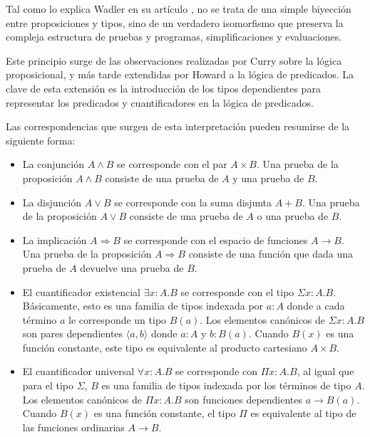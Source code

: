 Tal como lo explica Wadler en su artículo \cite{pas}, no se trata de una simple biyección entre proposiciones y tipos, sino de un verdadero isomorfismo que preserva la compleja estructura de pruebas y programas, simplificaciones y evaluaciones.

Este principio surge de las observaciones realizadas por Curry \cite{Curry} sobre la lógica proposicional, y más tarde extendidas por Howard \cite{Howard} a la lógica de predicados.
La clave de esta extensión es la introducción de los tipos dependientes para representar los predicados y cuantificadores en la lógica de predicados.

Las correspondencias que surgen de esta interpretación pueden resumirse de la siguiente forma:

\begin{itemize}
	\item La conjunción $A \wedge B$ se corresponde con el par $A \times B$.
	Una prueba de la proposición $A \wedge B$ consiste de una prueba de $A$ y una prueba de $B$.
	
	\item La disjunción $A \vee B$ se corresponde con la suma disjunta $A + B$.
	Una prueba de la proposición $A \vee B$ consiste de una prueba de $A$ o una prueba de $B$.
	
	\item La implicación $A \Rightarrow B$ se corresponde con el espacio de funciones $A \rightarrow B$.
	Una prueba de la proposición $A \Rightarrow B$ consiste de una función que dada una prueba de $A$ devuelve una prueba de $B$.
	
	\item El cuantificador existencial $\exists x:A.B$ se corresponde con el tipo $\Sigma x:A.B$.
	Básicamente, esto es una familia de tipos indexada por $a : A$ donde a cada término $a$ le corresponde un tipo $B(a)$.
	Los elementos canónicos de $\Sigma x:A.B$ son pares dependientes $\langle a, b \rangle$ donde $a:A$ y $b:B(a)$.
	Cuando $B(x)$ es una función constante, este tipo es equivalente al producto cartesiano $A \times B$.
	
	
	\item El cuantificador universal $\forall x:A.B$ se corresponde con $\Pi x:A.B$, al igual que para el tipo $\Sigma$, $B$ es una familia de tipos indexada por los términos de tipo $A$.
	Los elementos canónicos de $\Pi x:A.B$ son funciones dependientes $a \rightarrow B(a)$.
	Cuando $B(x)$ es una función constante, el tipo $\Pi$ es equivalente al tipo de las funciones ordinarias $A \rightarrow B$.
\end{itemize}



